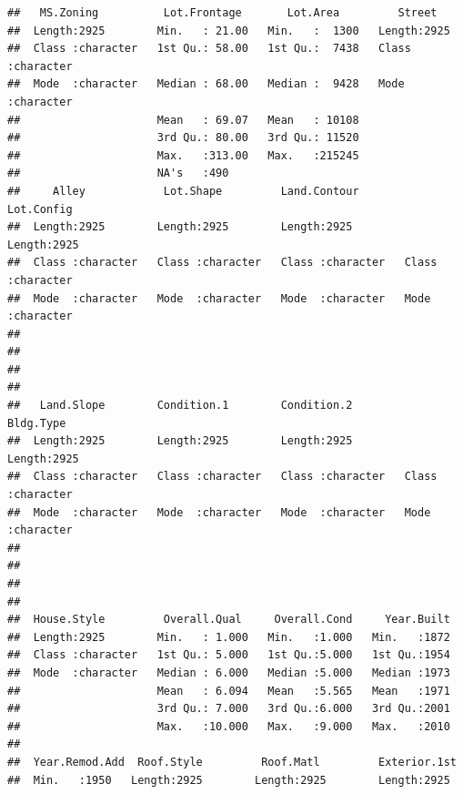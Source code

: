 \documentclass[
]{article}
\begin{document}
\begin{verbatim}
##   MS.Zoning          Lot.Frontage       Lot.Area         Street         
##  Length:2925        Min.   : 21.00   Min.   :  1300   Length:2925       
##  Class :character   1st Qu.: 58.00   1st Qu.:  7438   Class :character  
##  Mode  :character   Median : 68.00   Median :  9428   Mode  :character  
##                     Mean   : 69.07   Mean   : 10108                     
##                     3rd Qu.: 80.00   3rd Qu.: 11520                     
##                     Max.   :313.00   Max.   :215245                     
##                     NA's   :490                                         
##     Alley            Lot.Shape         Land.Contour        Lot.Config       
##  Length:2925        Length:2925        Length:2925        Length:2925       
##  Class :character   Class :character   Class :character   Class :character  
##  Mode  :character   Mode  :character   Mode  :character   Mode  :character  
##                                                                             
##                                                                             
##                                                                             
##                                                                             
##   Land.Slope        Condition.1        Condition.2         Bldg.Type        
##  Length:2925        Length:2925        Length:2925        Length:2925       
##  Class :character   Class :character   Class :character   Class :character  
##  Mode  :character   Mode  :character   Mode  :character   Mode  :character  
##                                                                             
##                                                                             
##                                                                             
##                                                                             
##  House.Style         Overall.Qual     Overall.Cond     Year.Built  
##  Length:2925        Min.   : 1.000   Min.   :1.000   Min.   :1872  
##  Class :character   1st Qu.: 5.000   1st Qu.:5.000   1st Qu.:1954  
##  Mode  :character   Median : 6.000   Median :5.000   Median :1973  
##                     Mean   : 6.094   Mean   :5.565   Mean   :1971  
##                     3rd Qu.: 7.000   3rd Qu.:6.000   3rd Qu.:2001  
##                     Max.   :10.000   Max.   :9.000   Max.   :2010  
##                                                                    
##  Year.Remod.Add  Roof.Style         Roof.Matl         Exterior.1st      
##  Min.   :1950   Length:2925        Length:2925        Length:2925       

\end{verbatim}
\end{document}
